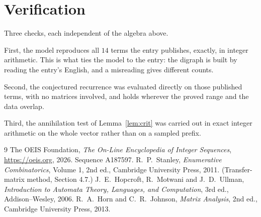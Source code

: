 \documentclass[11pt,a4paper]{article}
\theoremstyle{plain}
\theoremstyle{definition}
\begin{document}
\section{Verification}

Three checks, each independent of the algebra above.

First, the model reproduces all $14$ terms the entry publishes, exactly, in integer
arithmetic. This is what ties the model to the entry: the digraph is built by reading the
entry's English, and a misreading gives different counts.

Second, the conjectured recurrence was evaluated directly on those published terms, with no
matrices involved, and holds wherever the proved range and the data overlap.

Third, the annihilation test of Lemma~\ref{lem:crit} was carried out in exact integer
arithmetic on the whole vector rather than on a sampled prefix.

\begin{thebibliography}{9}
 The OEIS Foundation, \emph{The On-Line Encyclopedia of Integer
Sequences}, \url{https://oeis.org}, 2026. Sequence A187597.
 R.~P.~Stanley, \emph{Enumerative Combinatorics}, Volume 1, 2nd ed.,
Cambridge University Press, 2011. (Transfer-matrix method, Section 4.7.)
 J.~E.~Hopcroft, R.~Motwani and J.~D.~Ullman, \emph{Introduction to Automata
Theory, Languages, and Computation}, 3rd ed., Addison--Wesley, 2006.
 R.~A.~Horn and C.~R.~Johnson, \emph{Matrix Analysis}, 2nd ed., Cambridge
University Press, 2013.
\end{thebibliography}
\end{document}

